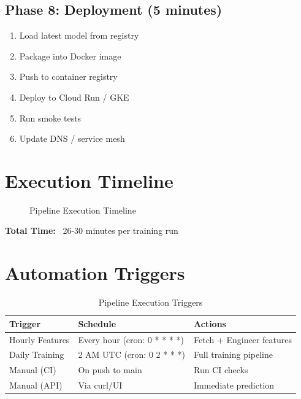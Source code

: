 \subsection{Phase 8: Deployment (5 minutes)}

\begin{enumerate}
    \item Load latest model from registry
    \item Package into Docker image
    \item Push to container registry
    \item Deploy to Cloud Run / GKE
    \item Run smoke tests
    \item Update DNS / service mesh
\end{enumerate}

\section{Execution Timeline}

\begin{figure}[H]
\centering
{}
\caption{Pipeline Execution Timeline}
\label{fig:timeline}
\end{figure}

\textbf{Total Time:} ~26-30 minutes per training run

\section{Automation Triggers}

\begin{table}[H]
\centering
\caption{Pipeline Execution Triggers}
\begin{tabularx}{\textwidth}{lXX}
\toprule
\textbf{Trigger} & \textbf{Schedule} & \textbf{Actions} \\
\midrule
Hourly Features & Every hour (cron: 0 * * * *) & Fetch + Engineer features \\
Daily Training & 2 AM UTC (cron: 0 2 * * *) & Full training pipeline \\
Manual (CI) & On push to main & Run CI checks \\
Manual (API) & Via curl/UI & Immediate prediction \\
\bottomrule
\end{tabularx}
\end{table}

